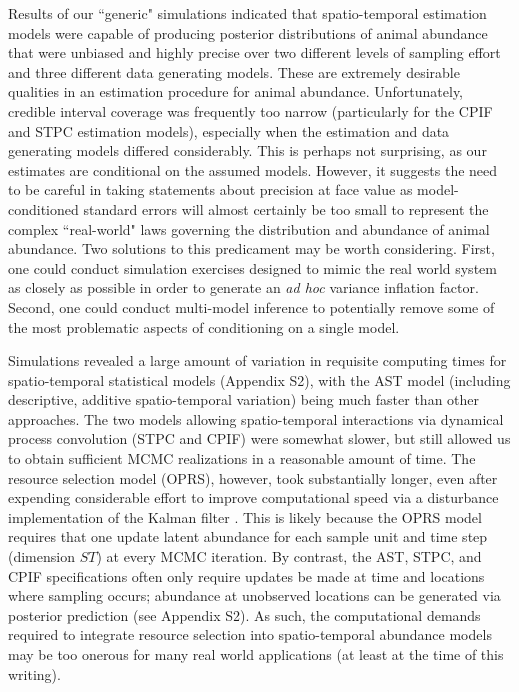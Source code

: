 \documentclass[12pt,english]{article}
\begin{document}
\begin{spacing}{1.9}
Results of our ``generic" simulations indicated that spatio-temporal estimation models were capable of producing posterior distributions of animal abundance that were unbiased and highly precise over two different levels of sampling effort and three different data generating models.  These are extremely desirable qualities in an estimation procedure for animal abundance. Unfortunately, credible interval coverage was frequently too narrow (particularly for the CPIF and STPC estimation models), especially when the estimation and data generating models differed considerably.  This is perhaps not surprising, as our estimates are conditional on the assumed models.  However, it suggests the need to be careful in taking statements about precision at face value as model-conditioned standard errors will almost certainly be too small to represent the complex ``real-world" laws governing the distribution and abundance of animal abundance.  Two solutions to this predicament may be worth considering.  First, one could conduct simulation exercises designed to mimic the real world system as closely as possible in order to generate an {\it ad hoc} variance inflation factor.  Second, one could conduct multi-model inference \citep[e.g., using Bayesian model averaging;][]{HoetingEtAl1999,HootenHobbs2014} to potentially remove some of the most problematic aspects of conditioning on a single model.

Simulations revealed a large amount of variation in requisite computing times for spatio-temporal statistical models (Appendix S2), with the AST model (including descriptive, additive spatio-temporal variation) being much faster than other approaches.  The two models allowing spatio-temporal interactions via dynamical process convolution (STPC and CPIF) were somewhat slower, but still allowed us to obtain sufficient MCMC realizations in a reasonable amount of time.  The resource selection model (OPRS), however, took substantially longer, even after expending considerable effort to improve computational speed via a disturbance implementation of the Kalman filter \citep[][see Appendix S2]{DurbinKoopman2002}.  This is likely because the OPRS model requires that one update latent abundance for each sample unit and time step (dimension $ST$) at every MCMC iteration.  By contrast, the AST, STPC, and CPIF specifications often only require updates be made at time and locations where sampling occurs; abundance at unobserved locations can be generated via posterior prediction (see Appendix S2).  As such, the computational demands required to integrate resource selection into spatio-temporal abundance models may be too onerous for many real world applications (at least at the time of this writing).


\end{spacing}
\end{document}
